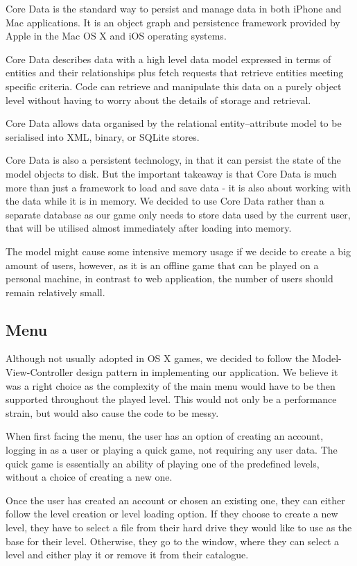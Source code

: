 Core Data is the standard way to persist and manage data in both iPhone and Mac applications. It is an object graph and persistence framework provided by Apple in the Mac OS X and iOS operating systems. 

Core Data describes data with a high level data model expressed in terms of entities and their relationships plus fetch requests that retrieve entities meeting specific criteria. Code can retrieve and manipulate this data on a purely object level without having to worry about the details of storage and retrieval. 

Core Data allows data organised by the relational entity–attribute model to be serialised into XML, binary, or SQLite stores.

Core Data is also a persistent technology, in that it can persist the state of the model objects to disk. But the important takeaway is that Core Data is much more than just a framework to load and save data - it is also about working with the data while it is in memory.
We decided to use Core Data rather than a separate database as our game only needs to store data used by the current user, that will be utilised almost immediately after loading into memory. 
  
The model might cause some intensive memory usage if we decide to create a big amount of users, however, as it is an offline game that can be played on a personal machine, in contrast to web application, the number of users should remain relatively small.

\vspace{10pt}

\subsection{Menu}

Although not usually adopted in OS X games, we decided to follow the Model-View-Controller design pattern in implementing our application. We believe it was a right choice as the complexity of the main menu would have to be then supported throughout the played level. This would not only be a performance strain, but would also cause the code to be messy.

When first facing the menu, the user has an option of creating an account, logging in as a user or playing a quick game, not requiring any user data. 
The quick game is essentially an ability of playing one of the predefined levels, without a choice of creating a new one.

Once the user has created an account or chosen an existing one, they can either follow the level creation or level loading option. If they choose to create a new level, they have to select a file from their hard drive they would like to use as the base for their level. Otherwise, they go to the window, where they can select a level and either play it or remove it from their catalogue.

